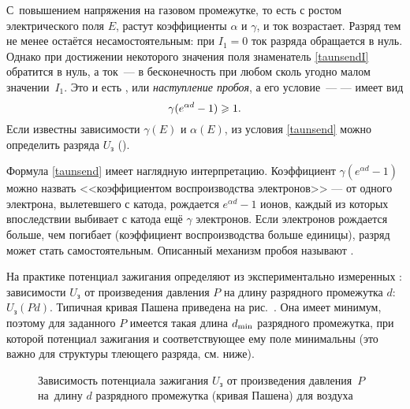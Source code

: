 \begin{labsupplement}
С~повышением напряжения на газовом промежутке, то есть с ростом электрического
поля $E$, растут коэффициенты $\alpha$ и $\gamma$, и ток возрастает.
Разряд тем не менее остаётся несамостоятельным: при $I_1=0$ ток разряда
обращается в нуль. Однако при достижении некоторого значения поля
знаменатель \eqref{taunsendI} обратится в нуль,
а ток~--- в бесконечность при любом сколь угодно малом значении~$I_1$.
Это и есть , или \emph{наступление пробоя}, а его
условие~---  --- имеет вид
\begin{equation}
    \eqmark{taunsend}
	\gamma(e^{\alpha d}-1)\ge 1.
\end{equation}
Если известны зависимости $\gamma(E)$ и $\alpha(E)$, из условия \eqref{taunsend}
можно определить  разряда $U_{з}$
().

Формула \eqref{taunsend} имеет наглядную интерпретацию. 
Коэффициент $\gamma (e^{\alpha d}-1)$ можно назвать
<<коэффициентом воспроизводства электронов>> --- от одного электрона,
вылетевшего с катода, рождается $e^{\alpha d}-1$ ионов,
каждый из которых впоследствии выбивает с катода ещё $\gamma$ электронов.
Если электронов рождается больше, чем погибает (коэффициент воспроизводства больше единицы), 
разряд может стать самостоятельным.
Описанный механизм пробоя называют . 

На практике потенциал зажигания определяют из экспериментально измеренных
: зависимости $U_{з}$ от произведения
давления $P$ на длину разрядного промежутка $d$: $U_{з}(Pd)$.
Типичная кривая Пашена приведена на рис.~.
Она имеет минимум, поэтому для заданного $P$ имеется такая длина
$d_{\rm min}$ разрядного промежутка,
при которой потенциал зажигания и соответствующее ему поле минимальны
(это важно для структуры тлеющего разряда, см. ниже).

\begin{figure}[h!]
	\centering
\footnotesize	{}
	\caption{Зависимость потенциала зажигания $U_\text{з}$ от произведения
давления~$P$ на~длину $d$ разрядного промежутка (кривая Пашена) для воздуха}
\end{figure}




\end{labsupplement}
